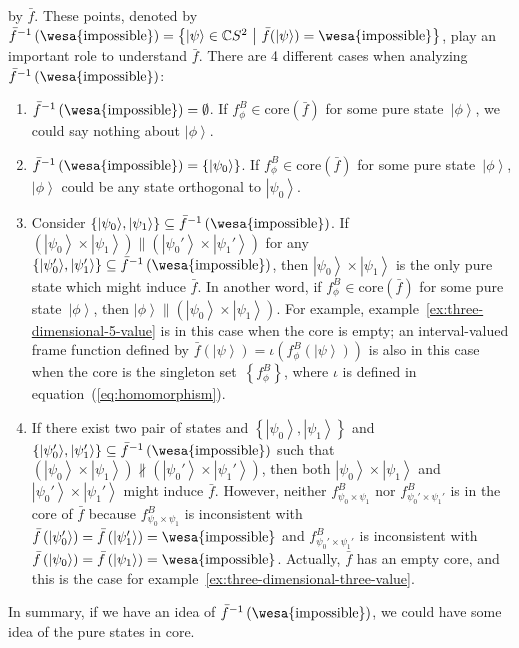 \documentclass[12pt]{iopart}
\theoremstyle{plain}
\theoremstyle{definition}
\newcommand{\imposs}{{\mbox{\wesa{impossible}}}}
\newcommand{\ket}[1]{{\left\vert{#1}\right\rangle}}
\newcommand{\set}[2]{\ensuremath{\left\{ {#1}~\middle|~{#2}\right\} }}
\begin{document}
by $\bar{f}$. These points, denoted by $\bar{f}^{-1}\left(\imposs\right)=\set{\ket{\psi}\in\mathbb{C}S^{2}}{\bar{f}(\ket{\psi})=\imposs}$,
play an important role to understand $\bar{f}$. There are 4 different
cases when analyzing $\bar{f}^{-1}\left(\imposs\right)$:
\begin{enumerate}
\item $\bar{f}^{-1}\left(\imposs\right)=\emptyset$. If $f_{\phi}^{B}\in\mathrm{core}\left(\bar{f}\right)$
for some pure state~$\ket{\phi}$, we could say nothing about $\ket{\phi}$.
\item $\bar{f}^{-1}\left(\imposs\right)=\left\{ \ket{\psi_{0}}\right\} $.
If $f_{\phi}^{B}\in\mathrm{core}\left(\bar{f}\right)$ for some pure
state~$\ket{\phi}$, $\ket{\phi}$ could be any state orthogonal
to $\ket{\psi_{0}}$.
\item Consider $\left\{ \ket{\psi_{0}},\ket{\psi_{1}}\right\} \subseteq\bar{f}^{-1}\left(\imposs\right)$.
If $\left(\ket{\psi_{0}}\times\ket{\psi_{1}}\right)\parallel\left(\ket{\psi_{0}'}\times\ket{\psi_{1}'}\right)$
for any $\left\{ \ket{\psi_{0}'},\ket{\psi_{1}'}\right\} \subseteq\bar{f}^{-1}\left(\imposs\right)$,
then $\ket{\psi_{0}}\times\ket{\psi_{1}}$ is the only pure state
which might induce $\bar{f}$. In another word, if $f_{\phi}^{B}\in\mathrm{core}\left(\bar{f}\right)$
for some pure state~$\ket{\phi}$, then $\ket{\phi}\parallel\left(\ket{\psi_{0}}\times\ket{\psi_{1}}\right)$.
For example, example~\ref{ex:three-dimensional-5-value} is in this
case when the core is empty; an interval-valued frame function defined
by $\bar{f}\left(\ket{\psi}\right)=\iota\left(f_{\phi}^{B}\left(\ket{\psi}\right)\right)$
is also in this case when the core is the singleton set~$\left\{ f_{\phi}^{B}\right\} $,
where $\iota$ is defined in equation~(\ref{eq:homomorphism}). 
\item If there exist two pair of states and $\left\{ \ket{\psi_{0}},\ket{\psi_{1}}\right\} $
and $\left\{ \ket{\psi_{0}'},\ket{\psi_{1}'}\right\} \subseteq\bar{f}^{-1}\left(\imposs\right)$
such that $\left(\ket{\psi_{0}}\times\ket{\psi_{1}}\right)\nparallel\left(\ket{\psi_{0}'}\times\ket{\psi_{1}'}\right)$,
then both $\ket{\psi_{0}}\times\ket{\psi_{1}}$ and $\ket{\psi_{0}'}\times\ket{\psi_{1}'}$
might induce $\bar{f}$. However, neither $f_{\psi_{0}\times\psi_{1}}^{B}$
nor $f_{\psi_{0}'\times\psi_{1}'}^{B}$ is in the core of $\bar{f}$
because $f_{\psi_{0}\times\psi_{1}}^{B}$ is inconsistent with $\bar{f}\left(\ket{\psi_{0}'}\right)=\bar{f}\left(\ket{\psi_{1}'}\right)=\imposs$
and $f_{\psi_{0}'\times\psi_{1}'}^{B}$ is inconsistent with $\bar{f}\left(\ket{\psi_{0}}\right)=\bar{f}\left(\ket{\psi_{1}}\right)=\imposs$.
Actually, $\bar{f}$ has an empty core, and this is the case for example~\ref{ex:three-dimensional-three-value}.
\end{enumerate}
In summary, if we have an idea of $\bar{f}^{-1}\left(\imposs\right)$,
we could have some idea of the pure states in core.
\end{document}
